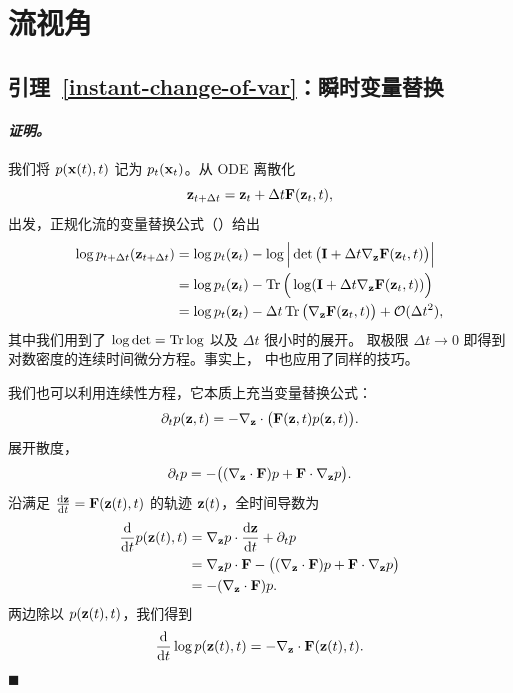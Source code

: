 \clearpage
\newpage

\section{流视角}\label{app-sec:flow-proof}

\subsection{引理~\ref{instant-change-of-var}：瞬时变量替换}
\paragraph{\textit{证明。}}

 我们将 $p({\mathbf{x}}(t), t)$ 记为 $p_t({\mathbf{x}}_t)$。从 ODE 离散化
\[
{\mathbf{z}}_{t+\Delta t} = {\mathbf{z}}_t + \Delta t  {\mathbf{F}}({\mathbf{z}}_t, t),
\]
出发，正规化流的变量替换公式（）给出
\begin{align*}
    \log p_{t+\Delta t}({\mathbf{z}}_{t+\Delta t}) 
    &= \log p_t({\mathbf{z}}_t) - \log \Big| \det\big({\mathbf{I}} + \Delta t \nabla_{{\mathbf{z}}} {\mathbf{F}}({\mathbf{z}}_t, t)\big) \Big| \\
    &= \log p_t({\mathbf{z}}_t) - \operatorname{Tr}\Big(\log({\mathbf{I}} + \Delta t \nabla_{{\mathbf{z}}} {\mathbf{F}}({\mathbf{z}}_t, t)) \Big) \\
    &= \log p_t({\mathbf{z}}_t) - \Delta t  \operatorname{Tr}\big(\nabla_{{\mathbf{z}}} {\mathbf{F}}({\mathbf{z}}_t, t)\big) + \mathcal{O}(\Delta t^2),
\end{align*}
其中我们用到了 $\log \det = \operatorname{Tr} \log$ 以及 $\Delta t$ 很小时的展开。
取极限 $\Delta t \to 0$ 即得到对数密度的连续时间微分方程。事实上， 中也应用了同样的技巧。

\vspace{0.3cm}
 我们也可以利用连续性方程，它本质上充当变量替换公式：
\[
\partial_t p({\mathbf{z}},t) = - \nabla_{{\mathbf{z}}} \cdot \big({\mathbf{F}}({\mathbf{z}},t) p({\mathbf{z}},t)\big).
\]
展开散度，
\[
\partial_t p = - \big( (\nabla_{{\mathbf{z}}} \cdot {\mathbf{F}}) p + {\mathbf{F}} \cdot \nabla_{{\mathbf{z}}} p \big).
\]
沿满足 $\frac{\mathop{}\!\mathrm{d} {\mathbf{z}}}{\mathop{}\!\mathrm{d} t} = {\mathbf{F}}({\mathbf{z}}(t), t)$ 的轨迹 ${\mathbf{z}}(t)$，全时间导数为
\begin{align*}
\frac{\mathop{}\!\mathrm{d}}{\mathop{}\!\mathrm{d} t} p({\mathbf{z}}(t), t) 
&= \nabla_{{\mathbf{z}}} p \cdot \frac{\mathop{}\!\mathrm{d} {\mathbf{z}}}{\mathop{}\!\mathrm{d} t} + \partial_t p \\
&= \nabla_{{\mathbf{z}}} p \cdot {\mathbf{F}} - \big( (\nabla_{{\mathbf{z}}} \cdot {\mathbf{F}}) p + {\mathbf{F}} \cdot \nabla_{{\mathbf{z}}} p \big) \\
&= - (\nabla_{{\mathbf{z}}} \cdot {\mathbf{F}}) p.
\end{align*}
两边除以 $p({\mathbf{z}}(t), t)$，我们得到
\[
\frac{\mathop{}\!\mathrm{d}}{\mathop{}\!\mathrm{d} t} \log p({\mathbf{z}}(t), t) = - \nabla_{{\mathbf{z}}} \cdot {\mathbf{F}}({\mathbf{z}}(t), t).
\]
\hfill$\blacksquare$



